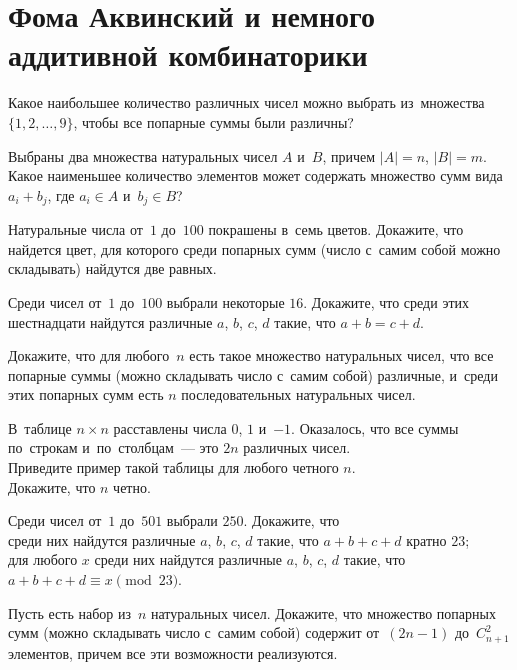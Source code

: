 
\section*{Фома Аквинский и немного аддитивной комбинаторики}


\begingroup
    \def\abs#1{\lvert #1 \rvert}%

\begin{problems}

\item
Какое наибольшее количество различных чисел можно выбрать из~множества
$\{ 1, 2, \ldots, 9 \}$, чтобы все попарные суммы были различны?

\item
Выбраны два множества натуральных чисел $A$ и~$B$, причем $\abs{A} = n$,
$\abs{B} = m$.
Какое наименьшее количество элементов может содержать множество сумм вида
$a_{i} + b_{j}$, где $a_{i} \in A$ и~$b_{j} \in B$?

\item
Натуральные числа от~$1$ до~$100$ покрашены в~семь цветов.
Докажите, что найдется цвет, для которого среди попарных сумм
(число с~самим собой можно складывать) найдутся две равных.

\item
Среди чисел от~$1$ до~$100$ выбрали некоторые $16$.
Докажите, что среди этих шестнадцати найдутся различные $a$, $b$, $c$, $d$
такие, что $a + b = c + d$.

\item
Докажите, что для любого~$n$ есть такое множество натуральных чисел, что все
попарные суммы (можно складывать число с~самим собой) различные, и~среди этих
попарных сумм есть $n$ последовательных натуральных чисел.

\item
В~таблице $n \times n$ расставлены числа $0$, $1$ и~$-1$.
Оказалось, что все суммы по~строкам и~по~столбцам~--- это $2 n$ различных
чисел.
\\
\subproblem
Приведите пример такой таблицы для любого четного $n$.
\\
\subproblem
Докажите, что $n$ четно.

\item
Среди чисел от~$1$ до~$501$ выбрали $250$.
Докажите, что
\\
\subproblem
среди них найдутся различные $a$, $b$, $c$, $d$ такие, что $a + b + c + d$
кратно $23$;
\\
\subproblem
для любого $x$ среди них найдутся различные $a$, $b$, $c$, $d$ такие, что
$a + b + c + d \equiv x \pmod{23}$.

\item
Пусть есть набор из~$n$ натуральных чисел.
Докажите, что множество попарных сумм (можно складывать число с~самим собой)
содержит от~$(2 n - 1)$ до~$C_{n+1}^{2}$ элементов, причем все эти возможности
реализуются.

\end{problems} %

